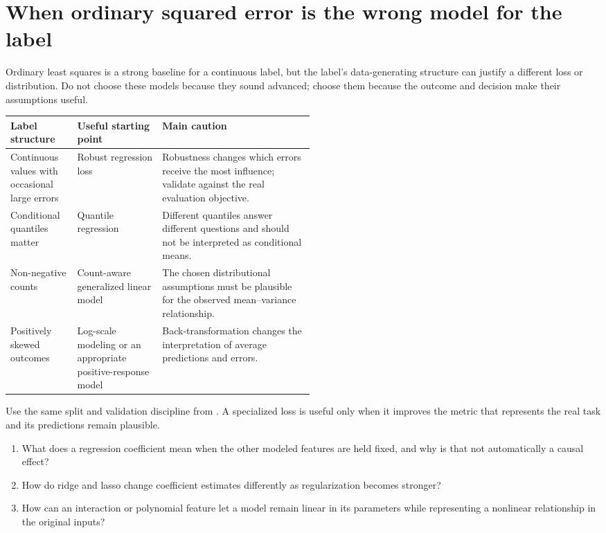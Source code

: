 \section{When ordinary squared error is the wrong model for the label}
\label{sec:special-regression-labels}

Ordinary least squares is a strong baseline for a continuous label, but the label's data-generating structure can justify a different loss or distribution. Do not choose these models because they sound advanced; choose them because the outcome and decision make their assumptions useful.

\begin{mltable}
\begin{tabularx}{\linewidth}{@{}p{0.22\linewidth}p{0.29\linewidth}X@{}}
\toprule
\rowcolor{MLPaleBlue!92}
Label structure & Useful starting point & Main caution \\
\midrule
Continuous values with occasional large errors & Robust regression loss & Robustness changes which errors receive the most influence; validate against the real evaluation objective. \\
Conditional quantiles matter & Quantile regression & Different quantiles answer different questions and should not be interpreted as conditional means. \\
Non-negative counts & Count-aware generalized linear model & The chosen distributional assumptions must be plausible for the observed mean--variance relationship. \\
Positively skewed outcomes & Log-scale modeling or an appropriate positive-response model & Back-transformation changes the interpretation of average predictions and errors. \\
\bottomrule
\end{tabularx}
\end{mltable}

Use the same split and validation discipline from . A specialized loss is useful only when it improves the metric that represents the real task and its predictions remain plausible.




\begin{quickcheck}
\begin{enumerate}
  \item What does a regression coefficient mean when the other modeled features are held fixed, and why is that not automatically a causal effect?
  \item How do ridge and lasso change coefficient estimates differently as regularization becomes stronger?
  \item How can an interaction or polynomial feature let a model remain linear in its parameters while representing a nonlinear relationship in the original inputs?
\end{enumerate}
\end{quickcheck}

